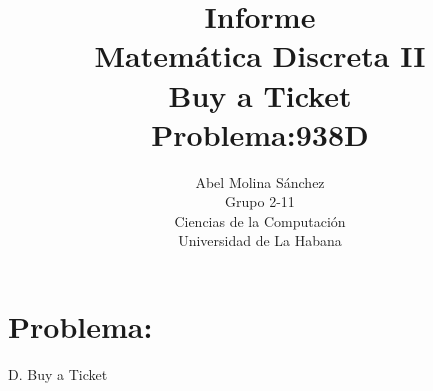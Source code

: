 \documentclass[12pt]{article}
\begin{document}
  \title{Informe\\
  Matem\'atica Discreta II\\
     Buy a Ticket\\
     Problema:938D}
  \author{Abel Molina S\'anchez\\
  Grupo 2-11\\
  Ciencias de la Computaci\'on\\
  Universidad de La Habana}
    \maketitle  

\newpage 

\section{Problema:}
\begin{center}
 D. Buy a Ticket\\
\end{center}
\end{document}
